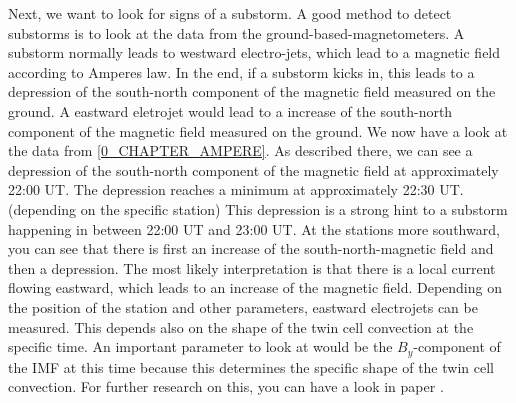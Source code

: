 \documentclass[10pt,a4paper]{article}
\begin{document}
Next, we want to look for signs of a substorm. A good method to detect substorms is to look at the data from the ground-based-magnetometers. A substorm normally leads to westward electro-jets, which lead to a magnetic field according to Amperes law. In the end, if a substorm kicks in, this leads to a depression of the south-north component of the magnetic field measured on the ground. A eastward eletrojet would lead to a increase of the south-north component of the magnetic field measured on the ground. We now have a look at the data from \ref{0_CHAPTER_AMPERE}. As described there, we can see a depression of the south-north component of the magnetic field at approximately 22:00 UT. The depression reaches a minimum at approximately 22:30 UT. (depending on the specific station) This depression is a strong hint to a substorm happening in between 22:00 UT and 23:00 UT. 
At the stations more southward, you can see that there is first an increase of the south-north-magnetic field and then a depression. The most likely interpretation is that there is a local current flowing eastward, which leads to an increase of the magnetic field. Depending on the position of the station and other parameters, eastward electrojets can be measured. This depends also on the shape of the twin cell convection at the specific time. An important parameter to look at would be the $B_y$-component of the IMF at this time because this determines the specific shape of the twin cell convection. For further research on this, you can have a look in paper \cite{paper2}.
\end{document}
